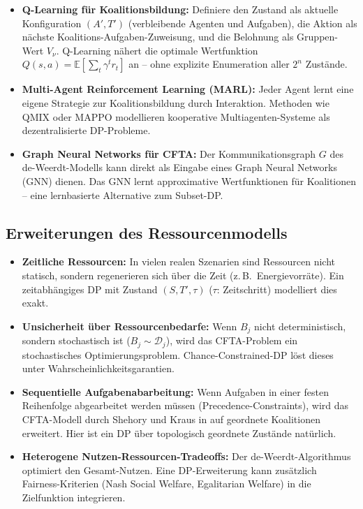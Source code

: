 ﻿\documentclass[a4paper,12pt]{article}
\theoremstyle{definition}
\begin{document}
\begin{itemize}
    \item \textbf{Q-Learning f\"{u}r Koalitionsbildung:} Definiere den Zustand als
          aktuelle Konfiguration $(A', T')$ (verbleibende Agenten und Aufgaben),
          die Aktion als n\"{a}chste Koalitions-Aufgaben-Zuweisung, und die Belohnung
          als Gruppen-Wert $V_\nu$. Q-Learning n\"{a}hert die optimale
          Wertfunktion $Q(s, a) = \mathbb{E}[\sum_{t} \gamma^t r_t]$ an
          -- ohne explizite Enumeration aller $2^n$ Zust\"{a}nde.
    \item \textbf{Multi-Agent Reinforcement Learning (MARL):} Jeder Agent
          lernt eine eigene Strategie zur Koalitionsbildung durch Interaktion.
          Methoden wie QMIX \cite{rashid2018} oder MAPPO modellieren kooperative
          Multiagenten-Systeme als dezentralisierte DP-Probleme.
    \item \textbf{Graph Neural Networks f\"{u}r CFTA:} Der Kommunikationsgraph $G$
          des de-Weerdt-Modells kann direkt als Eingabe eines Graph Neural
          Networks (GNN) dienen. Das GNN lernt approximative Wertfunktionen
          f\"{u}r Koalitionen -- eine lernbasierte Alternative zum Subset-DP.
\end{itemize}

\subsection{Erweiterungen des Ressourcenmodells}

\begin{itemize}
    \item \textbf{Zeitliche Ressourcen:} In vielen realen Szenarien sind
          Ressourcen nicht statisch, sondern regenerieren sich \"{u}ber die Zeit
          (z.\,B.\ Energievorr\"{a}te). Ein zeitabh\"{a}ngiges DP mit Zustand
          $(S, T', \tau)$ ($\tau$: Zeitschritt) modelliert dies exakt.
    \item \textbf{Unsicherheit \"{u}ber Ressourcenbedarfe:} Wenn $B_j$ nicht
          deterministisch, sondern stochastisch ist ($B_j \sim \mathcal{D}_j$),
          wird das CFTA-Problem ein stochastisches Optimierungsproblem.
          Chance-Constrained-DP \cite{prekopa1995} l\"{o}st dieses unter
          Wahrscheinlichkeitsgarantien.
    \item \textbf{Sequentielle Aufgabenabarbeitung:} Wenn Aufgaben in einer
          festen Reihenfolge abgearbeitet werden m\"{u}ssen (Precedence-Constraints),
          wird das CFTA-Modell durch Shehory und Kraus in \cite{sk96} auf
          geordnete Koalitionen erweitert. Hier ist ein DP \"{u}ber topologisch
          geordnete Zust\"{a}nde nat\"{u}rlich.
    \item \textbf{Heterogene Nutzen-Ressourcen-Tradeoffs:} Der de-Weerdt-Algorithmus
          optimiert den Gesamt-Nutzen. Eine DP-Erweiterung kann zus\"{a}tzlich
          Fairness-Kriterien (Nash Social Welfare, Egalitarian Welfare) in die
          Zielfunktion integrieren.
\end{itemize}
\end{document}
